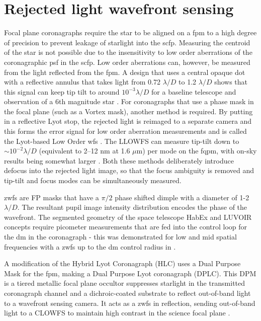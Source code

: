 \documentclass[letterpaper]{ar-1col}
\newcommand{\mum}{$\mu$m}
\newcommand{\ld}{$\lambda/D$}
\begin{document}

\section{Rejected light wavefront sensing} 

Focal plane coronagraphs require the star to be aligned on a \ac{fpm} to a high degree of precision to prevent leakage of starlight into the \ac{scfp}.
%
Measuring the centroid of the star is not possible due to the insensitivity to low order aberrations of the coronagraphic \ac{psf} in the \ac{scfp}.
%
Low order aberrations can, however, be measured from the light reflected from the \ac{fpm}.
%
A design that uses a central opaque dot with a reflective annulus that takes light from 0.72 \ld{} to 1.2 \ld{} shows that this signal can keep tip tilt to around $10^{-3}$\ld{} for a baseline telescope and observation of a 6th magnitude star \citep[Coronagraphic low order \ac{wfs}; CLOWFS ][]{Guyon09}.
%
For coronagraphs that use a phase mask in the focal plane (such as a Vortex mask), another method is required.
%
By putting in a reflective Lyot stop, the rejected light is reimaged to a separate camera and this forms the error signal for low order aberration measurements and is called the Lyot-based Low Order \ac{wfs} \citep[LLOWFS; ][]{Singh14,Singh15}.
%
The LLOWFS can measure tip-tilt down to $\sim 10^{-2}$\ld{} (equivalent to 2–12 nm at 1.6 \mum{}) per mode on the \ac{fqpm}, with on-sky results being somewhat larger \citep{Singh15}.
%
Both these methods deliberately introduce defocus into the rejected light image, so that the focus ambiguity is removed and tip-tilt and focus modes can be simultaneously measured.

\ac{zwfs} are FP masks that have a $\pi/2$ phase shifted dimple with a diameter of 1-2\ld{}.
%
The resultant pupil image intensity distribution encodes the phase of the wavefront.
%
The segmented geometry of the space telescope HabEx and LUVOIR concepts require picometer measurements that are fed into the control loop for the \ac{dm} in the coronagraph - this was demonstrated for low and mid spatial frequencies with a \ac{zwfs} up to the \ac{dm} control radius in \citet{Ruane20}.

A modification of the Hybrid Lyot Coronagraph (HLC) uses a Dual Purpose Mask for the \ac{fpm}, making a Dual Purpose Lyot coronagraph (DPLC).
%
This DPM is a tiered metallic focal plane occultor suppresses starlight in the transmitted coronagraph channel and a dichroic-coated substrate to reflect out-of-band light to a wavefront sensing camera.
%
It acts as a \ac{zwfs} in reflection, sending out-of-band light to a CLOWFS to maintain high contrast in the science focal plane \citep{Ruane23}.
\end{document}
